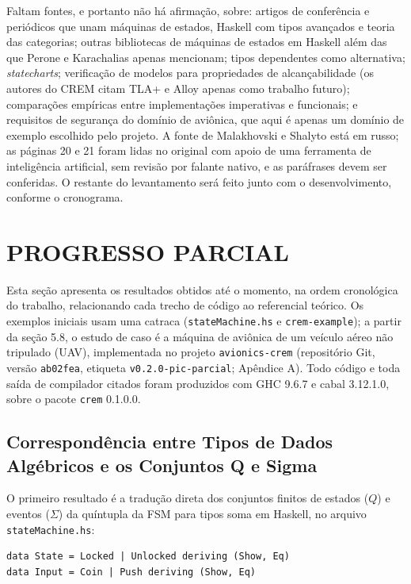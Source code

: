 \documentclass[12pt,a4paper]{article}
\begin{document}
Faltam fontes, e portanto não há afirmação, sobre: artigos de conferência e periódicos que unam máquinas de estados, Haskell com tipos avançados e teoria das categorias; outras bibliotecas de máquinas de estados em Haskell além das que Perone e Karachalias apenas mencionam; tipos dependentes como alternativa; \textit{statecharts}; verificação de modelos para propriedades de alcançabilidade (os autores do CREM citam TLA+ e Alloy apenas como trabalho futuro); comparações empíricas entre implementações imperativas e funcionais; e requisitos de segurança do domínio de aviônica, que aqui é apenas um domínio de exemplo escolhido pelo projeto. A fonte de Malakhovski e Shalyto está em russo; as páginas 20 e 21 foram lidas no original com apoio de uma ferramenta de inteligência artificial, sem revisão por falante nativo, e as paráfrases devem ser conferidas. O restante do levantamento será feito junto com o desenvolvimento, conforme o cronograma.

\section{PROGRESSO PARCIAL}

Esta seção apresenta os resultados obtidos até o momento, na ordem cronológica do trabalho, relacionando cada trecho de código ao referencial teórico. Os exemplos iniciais usam uma catraca (\texttt{stateMachine.hs} e \texttt{crem-example}); a partir da seção 5.8, o estudo de caso é a máquina de aviônica de um veículo aéreo não tripulado (UAV), implementada no projeto \texttt{avionics-crem} (repositório Git, versão \texttt{ab02fea}, etiqueta \texttt{v0.2.0-pic-parcial}; Apêndice A). Todo código e toda saída de compilador citados foram produzidos com GHC 9.6.7 e cabal 3.12.1.0, sobre o pacote \texttt{crem} 0.1.0.0.

\subsection{Correspondência entre Tipos de Dados Algébricos e os Conjuntos Q e Sigma}

O primeiro resultado é a tradução direta dos conjuntos finitos de estados ($Q$) e eventos ($\Sigma$) da quíntupla da FSM para tipos soma em Haskell, no arquivo \texttt{stateMachine.hs}:

\begin{verbatim}
data State = Locked | Unlocked deriving (Show, Eq)
data Input = Coin | Push deriving (Show, Eq)
\end{verbatim}
\end{document}
